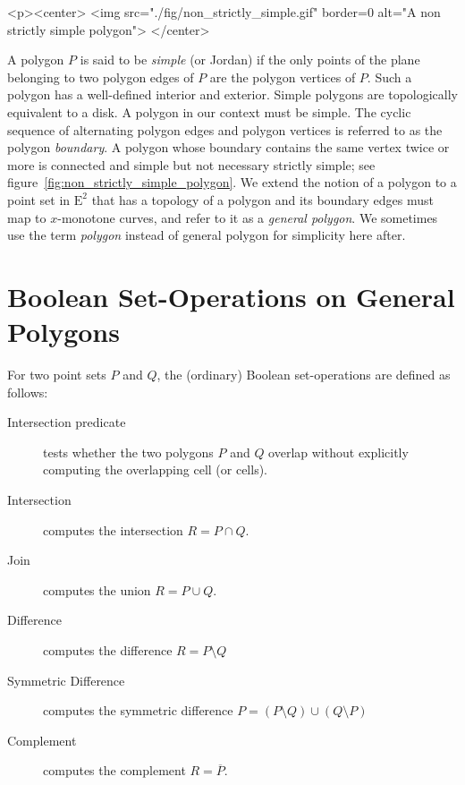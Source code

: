 \begin{ccHtmlOnly}
  <p><center>
    <img src="./fig/non_strictly_simple.gif" border=0 alt="A non strictly simple polygon">
  </center>
\end{ccHtmlOnly}
A polygon $P$ is said to be {\em simple} (or Jordan) if the
only points of the plane belonging to two polygon edges of $P$ are the
polygon vertices of $P$. Such a polygon has a well-defined interior
and exterior. Simple polygons are topologically equivalent to
a disk. A polygon in our context must be simple. The cyclic
sequence of alternating polygon edges and polygon vertices is referred
to as the polygon {\em boundary}. A polygon whose boundary contains the
same vertex twice or more is connected and simple but not
necessary strictly simple; see figure~\ref{fig:non_strictly_simple_polygon}. 
We extend the notion of a polygon to a point set in $\mathrm{E}^2$ that has 
a topology of a polygon and its boundary edges must map to $x$-monotone
curves, and refer to it as a {\em general polygon}. We sometimes use
the term {\em polygon} instead of general polygon for simplicity here
after.

\section{Boolean Set-Operations on General Polygons}
\label{bobs_sec:bops}
For two point sets $P$ and $Q$, the (ordinary) Boolean set-operations are
defined as follows:
\begin{description}
\item [Intersection predicate] tests whether the two polygons $P$ and $Q$
  overlap without explicitly computing the overlapping cell (or cells).     
\item[Intersection] computes the intersection $R = P \cap Q$.
\item[Join] computes the union $R = P \cup Q$.
\item [Difference] computes the difference $R = P \setminus Q$ 
\item [Symmetric Difference] computes the symmetric difference
  $P = (P \setminus Q) \cup (Q \setminus P)$
\item[Complement] computes the complement $R = \overline{P}$.
\end{description}

